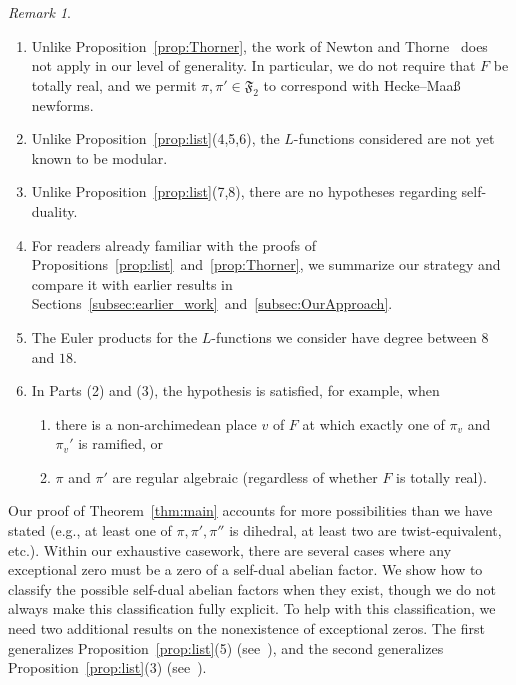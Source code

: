 \documentclass[11pt]{amsart}
\theoremstyle{remark}
\newtheorem{remark}[theorem]{Remark}
\numberwithin{equation}{section}
\begin{document}
\begin{remark}
\begin{enumerate}
    \item Unlike Proposition~\ref{prop:Thorner}, the work of Newton and Thorne~\cite{NewtonThorne3,NewtonThorne,NewtonThorne2} does not apply in our level of generality.  In particular, we do not require that $F$ be totally real, and we permit $\pi,\pi'\in\mathfrak{F}_2$ to correspond with Hecke--Maa{\ss} newforms.
    \item Unlike Proposition~\ref{prop:list}(4,5,6), the $L$-functions considered are not yet known to be modular.
    \item Unlike Proposition~\ref{prop:list}(7,8), there are no hypotheses regarding self-duality.
    \item For readers already familiar with the proofs of Propositions~\ref{prop:list}~and~\ref{prop:Thorner}, we summarize our strategy and compare it with earlier results in Sections~\ref{subsec:earlier_work}~and~\ref{subsec:OurApproach}.
    \item The Euler products for the $L$-functions we consider have degree between $8$ and $18$.
    \item In Parts (2) and (3), the hypothesis is satisfied, for example, when
	\begin{enumerate}
	\item[(i)] there is a non-archimedean place $v$ of $F$ at which exactly one of $\pi_v$ and $\pi_v'$ is ramified, or
	\item[(ii)] $\pi$ and $\pi'$ are regular algebraic (regardless of whether $F$ is totally real).
	\end{enumerate}
\end{enumerate}
\end{remark}

Our proof of Theorem~\ref{thm:main} accounts for more possibilities than we have stated (e.g., at least one of $\pi,\pi',\pi''$ is dihedral, at least two are twist-equivalent, etc.).  Within our exhaustive casework, there are several cases where any exceptional zero must be a zero of a self-dual abelian factor.  We show how to classify the possible self-dual abelian factors when they exist, though we do not always make this classification fully explicit.  To help with this classification, we need two additional results on the nonexistence of exceptional zeros.  The first generalizes Proposition~\ref{prop:list}(5) (see~\cite{RamakrishnanWang}), and the second generalizes Proposition~\ref{prop:list}(3) (see~\cite{Luo}).
\end{document}
